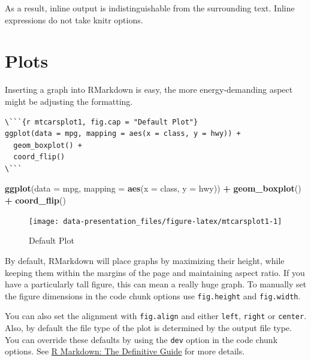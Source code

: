 \documentclass[]{book}
\newenvironment{Shaded}{\begin{snugshade}}{\end{snugshade}}
\newcommand{\DataTypeTok}[1]{\textcolor[rgb]{0.13,0.29,0.53}{#1}}
\newcommand{\KeywordTok}[1]{\textcolor[rgb]{0.13,0.29,0.53}{\textbf{#1}}}
\newcommand{\NormalTok}[1]{#1}
\newcommand{\OperatorTok}[1]{\textcolor[rgb]{0.81,0.36,0.00}{\textbf{#1}}}
\newcommand{\StringTok}[1]{\textcolor[rgb]{0.31,0.60,0.02}{#1}}
\theoremstyle{definition}
\theoremstyle{definition}
\theoremstyle{definition}
\theoremstyle{remark}
\begin{document}
As a result, inline output is indistinguishable from the surrounding
text. Inline expressions do not take knitr options.

\hypertarget{plots}{%
\section{Plots}\label{plots}}

Inserting a graph into RMarkdown is easy, the more energy-demanding
aspect might be adjusting the formatting.

\begin{verbatim}
\```{r mtcarsplot1, fig.cap = "Default Plot"}
ggplot(data = mpg, mapping = aes(x = class, y = hwy)) + 
  geom_boxplot() +
  coord_flip()
\```
\end{verbatim}

\begin{Shaded}
\begin{Highlighting}[]
\KeywordTok{ggplot}\NormalTok{(}\DataTypeTok{data =}\NormalTok{ mpg, }\DataTypeTok{mapping =} \KeywordTok{aes}\NormalTok{(}\DataTypeTok{x =}\NormalTok{ class, }\DataTypeTok{y =}\NormalTok{ hwy)) }\OperatorTok{+}\StringTok{ }
\StringTok{  }\KeywordTok{geom_boxplot}\NormalTok{() }\OperatorTok{+}
\StringTok{  }\KeywordTok{coord_flip}\NormalTok{()}
\end{Highlighting}
\end{Shaded}

\begin{figure}

{\centering \texttt{[image: data-presentation\_files/figure-latex/mtcarsplot1-1]} 

}

\caption{Default Plot}\label{fig:mtcarsplot1}
\end{figure}

By default, RMarkdown will place graphs by maximizing their height,
while keeping them within the margins of the page and maintaining aspect
ratio. If you have a particularly tall figure, this can mean a really
huge graph. To manually set the figure dimensions in the code chunk
options use \texttt{fig.height} and \texttt{fig.width}.

You can also set the alignment with \texttt{fig.align} and either
\texttt{left}, \texttt{right} or \texttt{center}. Also, by default the
file type of the plot is determined by the output file type. You can
override these defaults by using the \texttt{dev} option in the code
chunk options. See \href{https://bookdown.org/yihui/rmarkdown/}{R
Markdown: The Definitive Guide} for more details.
\end{document}
